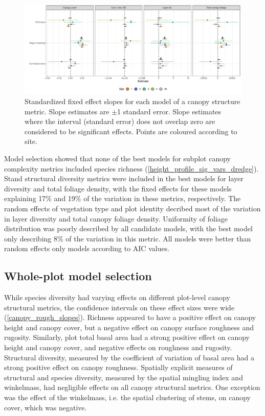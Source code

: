 \documentclass[11pt,a4paper]{article}
\begin{document}
\begin{figure}
	\includegraphics[width=\linewidth]{height_profile_mod_rich_slopes_sites}
	\caption{Standardized fixed effect slopes for each model of a canopy structure metric. Slope estimates are $\pm$1 standard error. Slope estimates where the interval (standard error) does not overlap zero are considered to be significant effects. Points are coloured according to site.}
	\label{height_profile_mod_rich_slopes_sites}
\end{figure}

Model selection showed that none of the best models for subplot canopy complexity metrics included species richness (\autoref{height_profile_sig_vars_dredge}). Stand structural diversity metrics were included in the best models for layer diversity and total foliage density, with the fixed effects for these models explaining 17\% and 19\% of the variation in these metrics, respectively. The random effects of vegetation type and plot identity decribed most of the variation in layer diversity and total canopy foliage density. Uniformity of foliage distribution was poorly described by all candidate models, with the best model only describing 8\% of the variation in this metric. All models were better than random effects only models according to AIC values.



\subsection{Whole-plot model selection}

While species diversity had varying effects on different plot-level canopy structural metrics, the confidence intervals on these effect sizes were wide (\autoref{canopy_rough_slopes}). Richness appeared to have a positive effect on canopy height and canopy cover, but a negative effect on canopy surface roughness and rugosity. Similarly, plot total basal area had a strong positive effect on canopy height and canopy cover, and negative effects on roughness and rugosity. Structural diversity, measured by the coefficient of variation of basal area had a strong positive effect on canopy roughness. Spatially explicit measures of structural and species diversity, measured by the spatial mingling index and winkelmass, had negligible effects on all canopy structural metrics. One exception was the effect of the winkelmass, i.e. the spatial clustering of stems, on canopy cover, which was negative.
\end{document}
